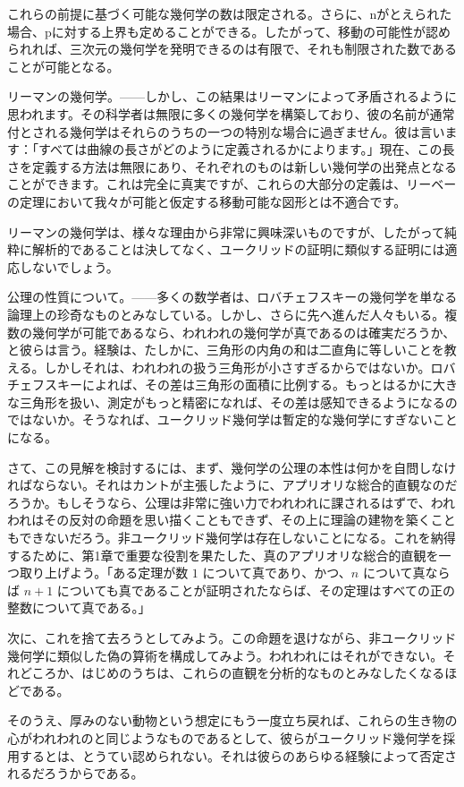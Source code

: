 \documentclass[a4paper,11pt,openany]{ltjsbook}
\begin{document}
これらの前提に基づく可能な幾何学の数は限定される。さらに、nがとえられた場合、pに対する上界も定めることができる。したがって、移動の可能性が認められれば、三次元の幾何学を発明できるのは有限で、それも制限された数であることが可能となる。

リーマンの幾何学。——しかし、この結果はリーマンによって矛盾されるように思われます。その科学者は無限に多くの幾何学を構築しており、彼の名前が通常付とされる幾何学はそれらのうちの一つの特別な場合に過ぎません。彼は言います：「すべては曲線の長さがどのように定義されるかによります。」現在、この長さを定義する方法は無限にあり、それぞれのものは新しい幾何学の出発点となることができます。これは完全に真実ですが、これらの大部分の定義は、リーベーの定理において我々が可能と仮定する移動可能な図形とは不適合です。


リーマンの幾何学は、様々な理由から非常に興味深いものですが、したがって純粋に解析的であることは決してなく、ユークリッドの証明に類似する証明には適応しないでしょう。

公理の性質について。——多くの数学者は、ロバチェフスキーの幾何学を単なる論理上の珍奇なものとみなしている。しかし、さらに先へ進んだ人々もいる。複数の幾何学が可能であるなら、われわれの幾何学が真であるのは確実だろうか、と彼らは言う。経験は、たしかに、三角形の内角の和は二直角に等しいことを教える。しかしそれは、われわれの扱う三角形が小さすぎるからではないか。ロバチェフスキーによれば、その差は三角形の面積に比例する。もっとはるかに大きな三角形を扱い、測定がもっと精密になれば、その差は感知できるようになるのではないか。そうなれば、ユークリッド幾何学は暫定的な幾何学にすぎないことになる。

さて、この見解を検討するには、まず、幾何学の公理の本性は何かを自問しなければならない。それはカントが主張したように、アプリオリな総合的直観なのだろうか。もしそうなら、公理は非常に強い力でわれわれに課されるはずで、われわれはその反対の命題を思い描くこともできず、その上に理論の建物を築くこともできないだろう。非ユークリッド幾何学は存在しないことになる。これを納得するために、第1章で重要な役割を果たした、真のアプリオリな総合的直観を一つ取り上げよう。「ある定理が数 $1$ について真であり、かつ、$n$ について真ならば $n + 1$ についても真であることが証明されたならば、その定理はすべての正の整数について真である。」

次に、これを捨て去ろうとしてみよう。この命題を退けながら、非ユークリッド幾何学に類似した偽の算術を構成してみよう。われわれにはそれができない。それどころか、はじめのうちは、これらの直観を分析的なものとみなしたくなるほどである。

そのうえ、厚みのない動物という想定にもう一度立ち戻れば、これらの生き物の心がわれわれのと同じようなものであるとして、彼らがユークリッド幾何学を採用するとは、とうてい認められない。それは彼らのあらゆる経験によって否定されるだろうからである。
\end{document}
